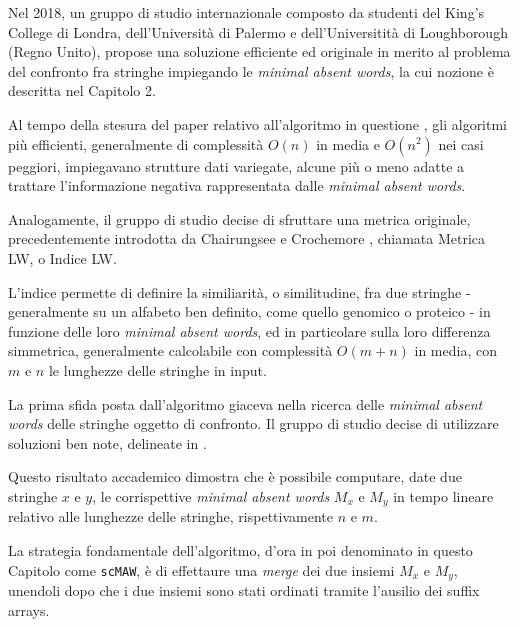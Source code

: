 Nel 2018, un gruppo di studio internazionale composto da studenti del King's College di Londra, dell'Università di Palermo e dell'Universitità di Loughborough (Regno Unito), propose una soluzione efficiente ed originale in merito al problema del confronto fra stringhe impiegando le \textit{minimal absent words}, la cui nozione è descritta nel Capitolo 2. 

\vspace{3mm}

Al tempo della stesura del paper relativo all'algoritmo in questione \cite{scMAW}, gli algoritmi più efficienti, generalmente di complessità $O(n)$ in media e $O(n^2 )$ nei casi peggiori, impiegavano strutture dati variegate, alcune più o meno adatte a trattare l'informazione negativa rappresentata dalle \textit{minimal absent words}. 

\vspace{3mm}

Analogamente, il gruppo di studio decise di sfruttare una metrica originale, precedentemente introdotta da Chairungsee e Crochemore \cite{CHAIRUNGSEE2012109}, chiamata Metrica LW, o Indice LW. 

\vspace{3mm}

L'indice permette di definire la similiarità, o similitudine, fra due stringhe - generalmente su un alfabeto ben definito, come quello genomico o proteico - in funzione delle loro \textit{minimal absent words}, ed in particolare sulla loro differenza simmetrica, generalmente calcolabile con complessità $O(m+n)$ in media, con $m$ e $n$ le lunghezze delle stringhe in input.

\vspace{3mm}

La prima sfida posta dall'algoritmo giaceva nella ricerca delle \textit{minimal absent words} delle stringhe oggetto di confronto. Il gruppo di studio decise di utilizzare soluzioni ben note, delineate in \cite{maw1}. 

Questo risultato accademico dimostra che è possibile computare, date due stringhe $x$ e $y$, le corrispettive \textit{minimal absent words} $M_x$ e $M_y$ in tempo lineare relativo alle lunghezze delle stringhe, rispettivamente $n$ e $m$. 

\vspace{3mm}

La strategia fondamentale dell'algoritmo, d'ora in poi denominato in questo Capitolo come \verb|scMAW|, è di effettaure una \textit{merge} dei due insiemi $M_x$ e $M_y$, unendoli dopo che i due insiemi sono stati ordinati tramite l'ausilio dei suffix arrays. 

